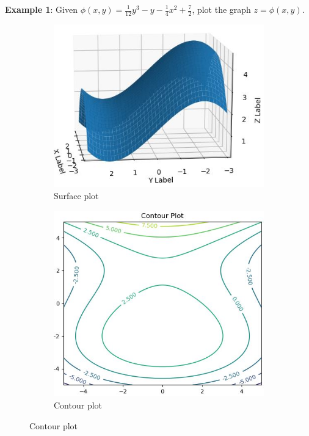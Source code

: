 \documentclass[10pt,a4paper]{article}
\begin{document}
\textbf{Example 1}: Given $\phi(x,y)=\frac{1}{12}y^3-y-\frac{1}{4}x^2+\frac{7}{2}$, plot the graph
$z = \phi(x,y)$.

\begin{figure}[h]
\centering
\begin{subfigure}{.5\textwidth}
  \centering
  \includegraphics[scale=0.7]{Ex1.JPG}
  \caption{Surface plot}
  \label{fig:sub1}
\end{subfigure}%
\begin{subfigure}{.5\textwidth}
  \centering
  \includegraphics[scale=0.5]{Ex2.JPG}
  \caption{Contour plot}
  \label{fig:sub2}
\end{subfigure}
\label{fig:test}
\end{figure}
\end{document}
